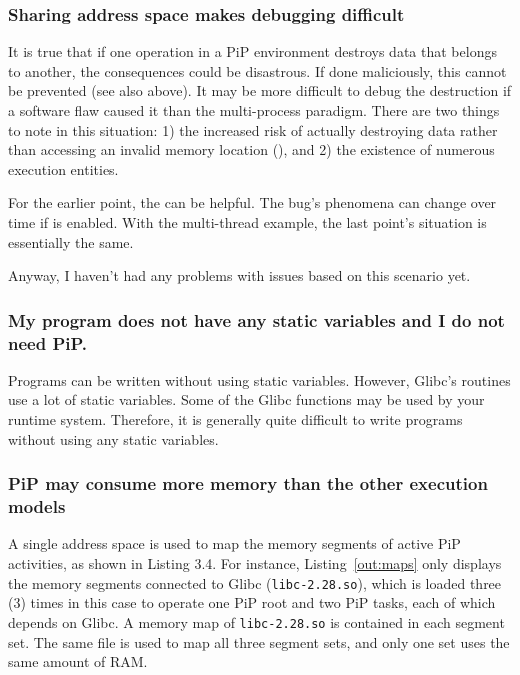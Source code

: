 \subsubsection*{Sharing address space makes debugging difficult}

It is true that if one operation in a PiP environment destroys data
that belongs to another, the consequences could be disastrous. If done
maliciously, this cannot be prevented (see also above). It may be more
difficult to debug the destruction if a software flaw caused it than
the multi-process paradigm. There are two things to note in this
situation: 1) the increased risk of actually destroying data rather
than accessing an invalid memory location (), and 2)
the existence of numerous execution entities.

For the earlier point, the  can be helpful. The bug's phenomena
can change over time if  is enabled. With the multi-thread
example, the last point's situation is essentially the same.  

Anyway, I haven't had any problems with issues based on this scenario
yet.

\subsubsection*{My program does not have any static variables and I do
  not need PiP.}

Programs can be written without using static variables. However,
Glibc's routines use a lot of static variables. Some of the Glibc
functions may be used by your runtime system. Therefore, it is
generally quite difficult to write programs without using any static
variables.

\subsubsection*{PiP may consume more memory than the other execution
  models}

A single address space is used to map the memory segments of active
PiP activities, as shown in Listing 3.4. For instance,
Listing~\ref{out:maps} only displays the memory segments connected to
Glibc ({\tt libc-2.28.so}), 
which is loaded three (3) times in this case to operate one PiP root
and two PiP tasks, each of which depends on Glibc. A memory map of
{\tt libc-2.28.so} is contained in each segment set. The same file is
used to map all three segment sets, and only one set uses the same
amount of RAM.

